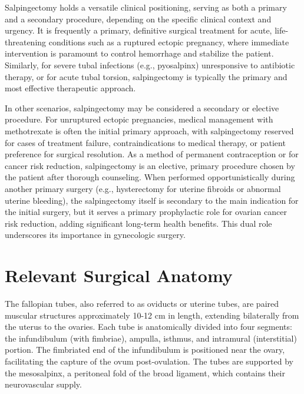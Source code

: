 Salpingectomy holds a versatile clinical positioning, serving as both a primary and a secondary procedure, depending on the specific clinical context and urgency. It is frequently a primary, definitive surgical treatment for acute, life-threatening conditions such as a ruptured ectopic pregnancy, where immediate intervention is paramount to control hemorrhage and stabilize the patient. Similarly, for severe tubal infections (e.g., pyosalpinx) unresponsive to antibiotic therapy, or for acute tubal torsion, salpingectomy is typically the primary and most effective therapeutic approach.

In other scenarios, salpingectomy may be considered a secondary or elective procedure. For unruptured ectopic pregnancies, medical management with methotrexate is often the initial primary approach, with salpingectomy reserved for cases of treatment failure, contraindications to medical therapy, or patient preference for surgical resolution. As a method of permanent contraception or for cancer risk reduction, salpingectomy is an elective, primary procedure chosen by the patient after thorough counseling. When performed opportunistically during another primary surgery (e.g., hysterectomy for uterine fibroids or abnormal uterine bleeding), the salpingectomy itself is secondary to the main indication for the initial surgery, but it serves a primary prophylactic role for ovarian cancer risk reduction, adding significant long-term health benefits. This dual role underscores its importance in gynecologic surgery.

\section*{Relevant Surgical Anatomy}
The fallopian tubes, also referred to as oviducts or uterine tubes, are paired muscular structures approximately 10-12 cm in length, extending bilaterally from the uterus to the ovaries. Each tube is anatomically divided into four segments: the infundibulum (with fimbriae), ampulla, isthmus, and intramural (interstitial) portion. The fimbriated end of the infundibulum is positioned near the ovary, facilitating the capture of the ovum post-ovulation. The tubes are supported by the mesosalpinx, a peritoneal fold of the broad ligament, which contains their neurovascular supply.

